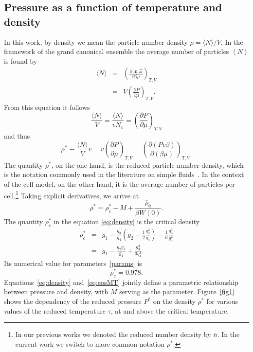 \subsection{Pressure as a function of temperature and density}
In this work, by density we mean the particle number density $\rho = \langle N \rangle / V$.
In the framework of the grand canonical ensemble the average number of particles $\left\langle N \right\rangle$ is found by 
\begin{eqnarray*}
	\langle N \rangle & = & \left(\frac{\partial \ln\Xi}{\partial \beta \mu}\right)_{T,V} 
	\\
	& = & V \left(\frac{\partial P}{\partial \mu}\right)_{T,V}.
\end{eqnarray*}
From this equation it follows
\begin{equation*}
	\frac{\langle N \rangle}{V} = \frac{\langle N \rangle}{v N_v} = \left(\frac{\partial P}{\partial \mu}\right)_{T,V}
\end{equation*}
and thus
\begin{equation}
	\rho^* \equiv \frac{\langle N \rangle}{V} v = v \left(\frac{\partial P}{\partial \mu}\right)_{T,V} 
	= \left(\frac{\partial (Pv\beta)}{\partial (\beta \mu)}\right)_{T,V}.
\end{equation}
The quantity $\rho^*$, on the one hand, is the reduced particle number density, which is the notation commonly used in the literature on simple fluids~\cite{HansenMcDonald2013}. In the context of the cell model, on the other hand, it is the average number of particles per cell.\footnote{In our previous works we denoted the reduced number density by $\bar{n}$. In the current work we switch to more common notation $\rho^*$.}
Taking explicit derivatives, we arrive at
\begin{equation}\label{eq:density}
	\rho^* = \rho^*_c - M + \frac{ \bar \rho_0}{\beta W(0)}.
\end{equation}
The quantity $\rho^*_c$ in the equation \eqref{eq:density} is the critical density~\cite{KozlovskiiDobush2020}
\begin{eqnarray}\label{eq:crit_dens}
	\rho^*_c & = & g_1 - \frac{g_3}{g_4}\left(  g_2 - \frac{1}{2} \frac{g_3^2}{g_4}\right) - \frac{1}{6} \frac{g_3^3}{g_4^2} 
	\nonumber\\
	& = & g_1 - \frac{g_2 g_3}{g_4} + \frac{g_3^3}{3g_4^2}
\end{eqnarray}
Its numerical value for parameters~\eqref{params} is
\begin{equation*}
	\rho^*_c = 0.978.
\end{equation*}
Equations~\eqref{eq:density} and~\eqref{eq:eosMT} jointly define a parametric relationship between pressure and density, with $M$ serving as the parameter. Figure~\ref{fig1} shows the dependency of the reduced pressure $P^*$ on the density $\rho^*$ for various values of the reduced temperature $\tau$, at and above the critical temperature.

